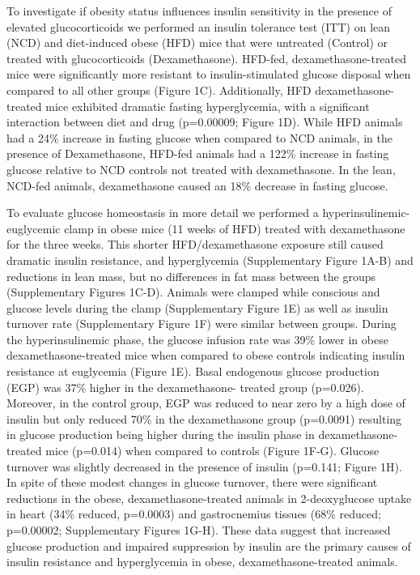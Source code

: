 \documentclass[11pt]{article} %
\begin{document}
To investigate if obesity status influences insulin sensitivity in the
presence of elevated glucocorticoids we performed an insulin tolerance
test (ITT) on lean (NCD) and diet-induced obese (HFD) mice that were
untreated (Control) or treated with glucocorticoids (Dexamethasone). HFD-fed, dexamethasone-treated mice were significantly more
resistant to insulin-stimulated glucose disposal when compared to all
other groups (Figure 1C). Additionally, HFD dexamethasone-treated mice
exhibited dramatic fasting hyperglycemia, with a significant interaction
between diet and drug (p=0.00009; Figure 1D). While HFD animals had a
24\% increase in fasting glucose when compared to NCD animals, in the
presence of Dexamethasone, HFD-fed animals had a 122\% increase in
fasting glucose relative to NCD controls not treated with dexamethasone.
In the lean, NCD-fed animals, dexamethasone caused an 18\% decrease in
fasting glucose.

To evaluate glucose homeostasis in more detail we performed a
hyperinsulinemic-euglycemic clamp in obese mice (11 weeks of HFD)
treated with dexamethasone for the three weeks. This shorter
HFD/dexamethasone exposure still caused dramatic insulin resistance, and
hyperglycemia (Supplementary Figure 1A-B) and reductions in lean mass,
but no differences in fat mass between the groups (Supplementary Figures
1C-D). Animals were clamped while conscious and glucose levels during
the clamp (Supplementary Figure 1E) as well as insulin turnover rate
(Supplementary Figure 1F) were similar between groups. During the
hyperinsulinemic phase, the glucose infusion rate was 39\% lower in
obese dexamethasone-treated mice when compared to obese controls
indicating insulin resistance at euglycemia (Figure 1E). Basal
endogenous glucose production (EGP) was 37\% higher in the
dexamethasone- treated group (p=0.026). Moreover, in the control group,
EGP was reduced to near zero by a high dose of insulin but only reduced
70\% in the dexamethasone group (p=0.0091) resulting in glucose
production being higher during the insulin phase in
dexamethasone-treated mice (p=0.014) when compared to controls (Figure
1F-G). Glucose turnover was slightly decreased in the presence of
insulin (p=0.141; Figure 1H). In spite of these modest changes in
glucose turnover, there were significant reductions in the obese,
dexamethasone-treated animals in 2-deoxyglucose uptake in heart (34\%
reduced, p=0.0003) and gastrocnemius tissues (68\% reduced; p=0.00002;
Supplementary Figures 1G-H). These data suggest that increased glucose
production and impaired suppression by insulin are the primary causes of
insulin resistance and hyperglycemia in obese, dexamethasone-treated
animals.
\end{document}
